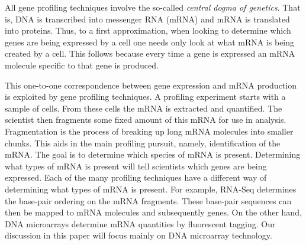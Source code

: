 \documentclass[reqno,12pt,oneside]{report}\usepackage[]{graphicx}\usepackage[]{color}
\theoremstyle{plain}
\theoremstyle{definition}
\theoremstyle{remark}
\numberwithin{theorem}{chapter}     %
\begin{document}
All gene profiling techniques involve the so-called \emph{central dogma of genetics}. That is, DNA is transcribed into messenger RNA (mRNA) and mRNA is translated into proteins. Thus, to a first approximation, when looking to determine which genes are being expressed by a cell one needs only look at what mRNA is being created by a cell. This follows because every time a gene is expressed an mRNA molecule specific to that gene is produced.

This one-to-one correspondence between gene expression and mRNA production is exploited by gene profiling techniques. A profiling experiment starts with a sample of cells. From these cells the mRNA is extracted and quantified. The scientist then fragments some fixed amount of this mRNA for use in analysis. Fragmentation is the process of breaking up long mRNA molecules into smaller chunks. This aids in the main profiling pursuit, namely, identification of the mRNA. The goal is to determine which species of mRNA is present. Determining what types of mRNA is present will tell scientists which genes are being expressed. Each of the many profiling techniques have a different way of determining what types of mRNA is present. For example, RNA-Seq determines the base-pair ordering on the mRNA fragments. These base-pair sequences can then be mapped to mRNA molecules and subsequently genes. On the other hand, DNA microarrays determine mRNA quantities by fluorescent tagging. Our discussion in this paper will focus mainly on DNA microarray technology.
\end{document}
